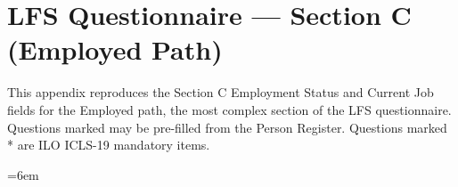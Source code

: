
\chapter{LFS Questionnaire — Section C (Employed Path)}
\label{app:questionnaire}

This appendix reproduces the Section C Employment Status and Current Job fields
for the Employed path, the most complex section of the LFS questionnaire.
Questions marked \textdagger{} may be pre-filled from the Person Register.
Questions marked * are ILO ICLS-19 mandatory items.

\begingroup
\setlength{\tabcolsep}{3pt}
\footnotesize
\renewcommand{\arraystretch}{1.5}
\emergencystretch=6em
